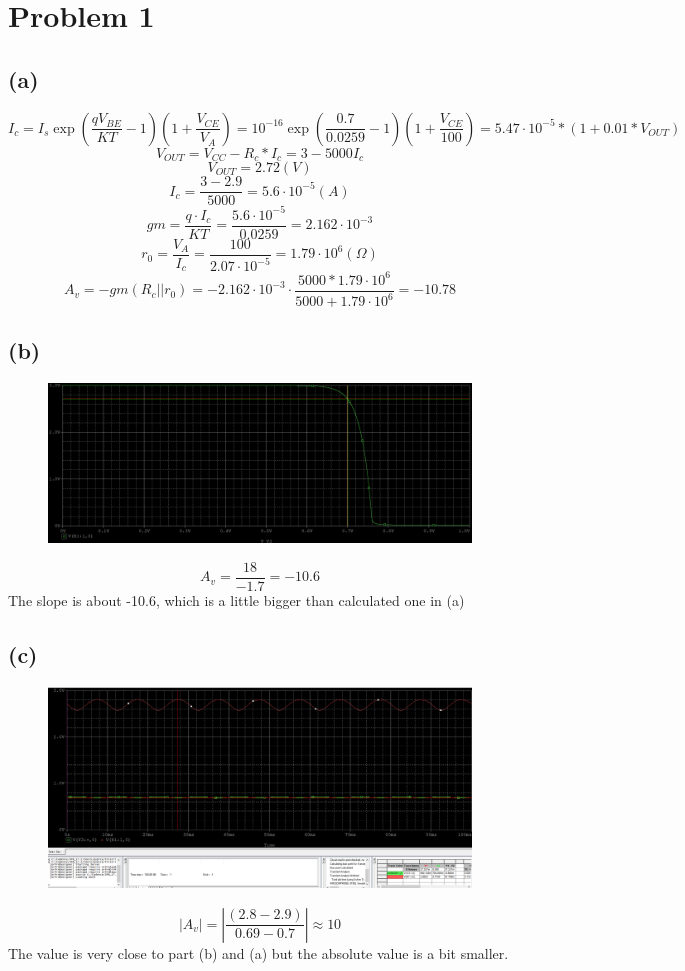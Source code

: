 \documentclass[12pt]{article}
\begin{document}
\newpage
\section{Problem 1}
\subsection{(a)}
$$I_c=I_s \exp(\frac{q V_{BE}}{KT}-1)(1+\frac{V_{CE}}{V_A})=10^{-16}\exp(\frac{0.7}{0.0259}-1)(1+\frac{V_{CE}}{100})=5.47\cdot10^{-5}*(1+0.01*V_{OUT})$$
$$V_{OUT}=V_{CC}-R_c*I_c=3-5000I_c$$
$$V_{OUT}=2.72(V)$$
$$I_c=\frac{3-2.9}{5000}=5.6\cdot10^{-5}(A)$$
$$gm=\frac{q\cdot I_c}{KT}=\frac{5.6\cdot10^{-5}}{0.0259}=2.162\cdot10^{-3}$$
$$r_0=\frac{V_A}{I_c}=\frac{100}{2.07\cdot 10^{-5}}=1.79\cdot10^{6}(\Omega)$$
$$A_v=-gm(R_c||r_0)=-2.162\cdot10^{-3}\cdot\frac{5000*1.79\cdot10^{6}}{5000+1.79\cdot10^{6}}=-10.78$$
\subsection{(b)}
\begin{figure}[H]
\centering
\includegraphics[scale=0.25]{P1.png}
\end{figure}
$$A_v=\frac{18}{-1.7}=-10.6$$
The slope is about -10.6, which is a little bigger than calculated one in (a)
\subsection{(c)}
\begin{figure}[H]
\centering
\includegraphics[scale=0.25]{P2.png}
\end{figure}
$$|A_v|=|\frac{(2.8-2.9)}{0.69-0.7}|\approx10$$
The value is very close to part (b) and (a) but the absolute value is a bit smaller.
\end{document}
